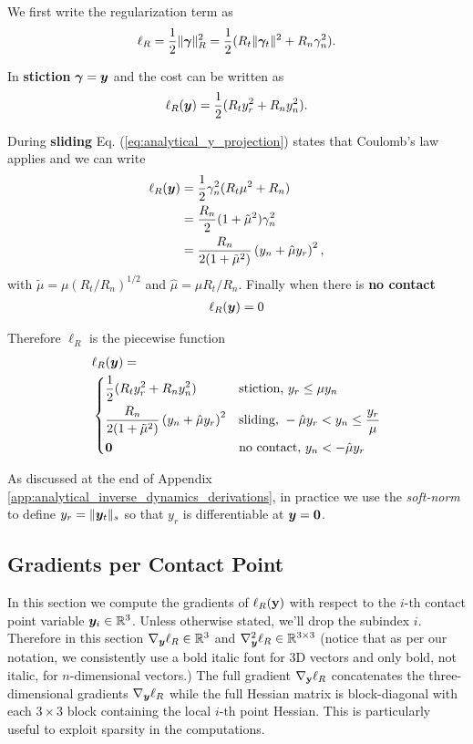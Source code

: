 We first write the regularization term as
\begin{eqnarray*}
	\ell_R = \frac{1}{2}\Vert{\bm\gamma}\Vert_R^2=\frac{1}{2}(R_t\Vert{\bm\gamma}_t\Vert^2+R_n\gamma_n^2).
\end{eqnarray*}

In \textbf{stiction} ${\bm\gamma}={\bm{y}}$ and the cost can be written as
\begin{eqnarray*}
	\ell_R({\bm{y}}) = \frac{1}{2}(R_t y_r^2+R_n y_n^2).
\end{eqnarray*}

During \textbf{sliding} Eq. (\ref{eq:analytical_y_projection}) states that Coulomb's law applies and we can write
\begin{align*}
	\ell_R({\bm{y}})
	&=\frac{1}{2}\gamma_n^2(R_t\mu^2+R_n)\\
	&=\frac{R_n}{2}(1+\tilde\mu^2)\gamma_n^2\\
	&=\frac{R_n}{2(1+\tilde\mu^2)}\left(y_n + \hat\mu y_r\right)^2,
\end{align*}
with $\tilde{\mu}=\mu (R_t/R_n)^{1/2}$ and $\hat{\mu}=\mu R_t/R_n$. Finally when there is \textbf{no contact}
\begin{eqnarray*}
	\ell_R({\bm{y}}) = 0
\end{eqnarray*}

Therefore $\ell_R$ is the piecewise function
\begin{align}
	&\ell_R(\vf{y}) = 
	\label{eq:ell_R_piecewise}\\	
&\begin{dcases}
	\frac{1}{2}(R_t y_r^2+R_n y_n^2) & \text{stiction, } y_r \le \mu y_n\\
	\frac{R_n}{2(1+\tilde\mu^2)}\left(y_n + \hat\mu y_r\right)^2 & \text{sliding, } -\hat\mu y_r < y_n \leq \frac{y_r}{\mu}\\
    \vf{0} & \text{no contact, } y_n < -\hat\mu y_r
\end{dcases}\nonumber	
\end{align}

As discussed at the end of Appendix
\ref{app:analytical_inverse_dynamics_derivations}, in practice we use the
\emph{soft-norm} to define $y_r=\Vert{\bm{y}}_t\Vert_s$ so that $y_r$ is
differentiable at ${\bm{y}}={\bm{0}}$.

\subsection{Gradients per Contact Point}
In this section we compute the gradients of $\ell_R({\mathbf{y}})$ with respect to the
$i\text{-th}$ contact point variable ${\bm{y}}_i\in\mathbb{R}^3$. Unless otherwise
stated, we'll drop the subindex $i$. Therefore in this section $\nabla_{\bm{y}}\ell_R\in\mathbb{R}^3$ and
$\nabla_{\bm{y}}^2\ell_R\in\mathbb{R}^{3\times 3}$ (notice that as per our
notation, we consistently use a bold italic font for 3D vectors and only bold,
not italic, for $n\text{-dimensional}$ vectors.) The full gradient
$\nabla_{\mathbf{y}}\ell_R$ concatenates the three-dimensional gradients
$\nabla_{\bm{y}}\ell_R$ while the full Hessian matrix is block-diagonal with each
$3\times 3$ block containing the local $i\text{-th}$ point Hessian. This is
particularly useful to exploit sparsity in the computations.

